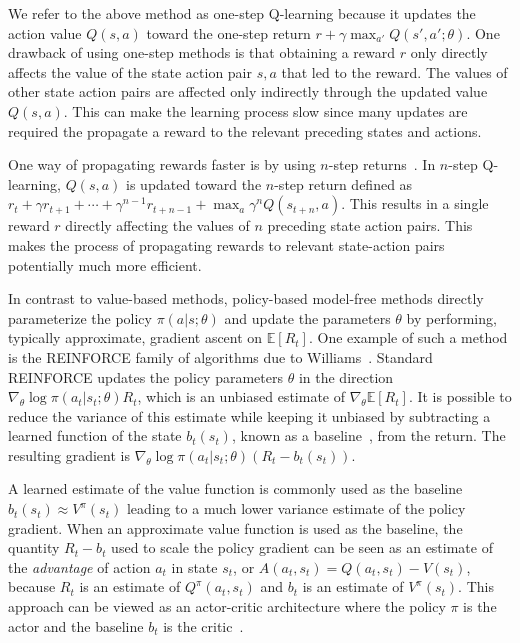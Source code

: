 \documentclass{article} \usepackage{times}
\begin{document}
We refer to the above method as one-step Q-learning because it updates the action value $Q(s,a)$ toward the one-step return $r+\gamma \max_{a'}Q(s',a';\theta)$.
One drawback of using one-step methods is that obtaining a reward $r$ only directly affects the value of the state action pair $s,a$ that led to the reward.
The values of other state action pairs are affected only indirectly through the updated value $Q(s,a)$.
This can make the learning process slow since many updates are required the propagate a reward to the relevant preceding states and actions.



One way of propagating rewards faster is by using $n$-step returns~\citep{watkins1989learning,peng1996msq}. In $n$-step Q-learning, $Q(s,a)$ is updated toward the $n$-step return defined as
$r_t + \gamma r_{t+1} + \cdots + \gamma^{n-1} r_{t+n-1} + \max_a \gamma^n Q(s_{t+n}, a)$.
This results in a single reward $r$ directly affecting the values of $n$ preceding state action pairs.
This makes the process of propagating rewards to relevant state-action pairs potentially much more efficient.



In contrast to value-based methods, policy-based model-free methods directly parameterize the policy $\pi(a|s;\theta)$ and update the parameters $\theta$ by performing, typically approximate, gradient ascent on $\mathbb{E}[R_t]$.
One example of such a method is the REINFORCE family of algorithms due to Williams~.
Standard REINFORCE updates the policy parameters $\theta$ in the direction $\nabla_{\theta}\log\pi(a_t|s_t;\theta) R_t$, which is an unbiased estimate of $\nabla_{\theta} \mathbb{E}[R_t]$.
It is possible to reduce the variance of this estimate while keeping it unbiased by subtracting a learned function of the state $b_t(s_t)$, known as a baseline~\citep{Williams1992}, from the return.
The resulting gradient is
$\nabla_{\theta}\log\pi(a_t|s_t;\theta) \left(R_t-b_t(s_t)\right)$.


A learned estimate of the value function is commonly used as the baseline $b_t(s_t)\approx V^{\pi}(s_t)$ leading to a much lower variance estimate of the policy gradient.
When an approximate value function is used as the baseline, the quantity $R_t-b_t$ used to scale the policy gradient can be seen as an estimate of the \emph{advantage} of action $a_t$ in state $s_t$, or $A(a_t,s_t)=Q(a_t,s_t)-V(s_t)$, because $R_t$ is an estimate of $Q^{\pi}(a_t,s_t)$ and $b_t$ is an estimate of $V^{\pi}(s_t)$.
This approach can be viewed as an actor-critic architecture where the policy $\pi$ is the actor and the baseline $b_t$ is the critic~\citep{sutton:book,degris2012model}.
\end{document}
